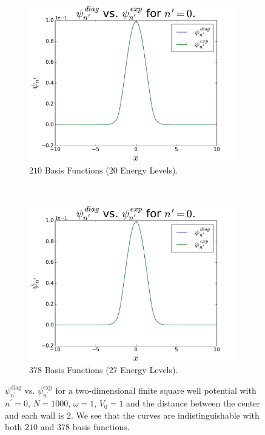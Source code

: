 \documentclass[../main.tex]{subfiles}
\begin{document}
\begin{figure}
    \centering
    \begin{subfigure}{0.5\textwidth}
        \centering
        \includegraphics[scale=0.4]{figures/psiComp/psiCompSquare_nPrime0_BF210}
        \caption{$210$ Basis Functions ($20$ Energy Levels).}
        \label{fig:nPrime0aSquare}
    \end{subfigure}%
    ~ 
    \begin{subfigure}{0.5\textwidth}
        \centering
        \includegraphics[scale=0.4]{figures/psiComp/psiCompSquare_nPrime0_BF378}
        \caption{$378$ Basis Functions ($27$ Energy Levels).}
        \label{fig:nPrime0bSquare}
    \end{subfigure}
    \caption{$\psi_{n^\prime}^\textrm{diag}$ vs. $\psi_{n^\prime}^\textrm{exp}$ for a two-dimensional finite square well potential with $n^\prime = 0$, $N=1000$, $\omega = 1$, $V_0 = 1$ and the distance between the center and each wall is $2$. We see that the curves are indistinguishable with both $210$ and $378$ basis functions.}
    \label{fig:nPrime0Square}
\end{figure}
\end{document}
